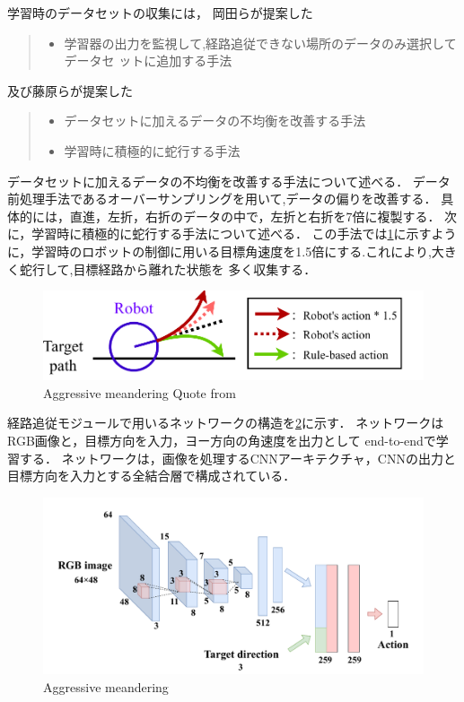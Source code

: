 学習時のデータセットの収集には，
岡田ら\cite{okada2021}が提案した
\begin{quote}
    \begin{itemize}
     \item 学習器の出力を監視して,経路追従できない場所のデータのみ選択してデータセ
     ットに追加する手法
    \end{itemize}
   \end{quote}
及び藤原ら\cite{fujiwara2023}が提案した
\begin{quote}
    \begin{itemize}
     \item データセットに加えるデータの不均衡を改善する手法
     \item 学習時に積極的に蛇行する手法
    \end{itemize}
   \end{quote}

データセットに加えるデータの不均衡を改善する手法について述べる．
データ前処理手法であるオーバーサンプリングを用いて,データの偏りを改善する．
具体的には，直進，左折，右折のデータの中で，左折と右折を7倍に複製する．
次に，学習時に積極的に蛇行する手法について述べる．
この手法では\ref{fig:dakou}に示すように，学習時のロボットの制御に用いる目標角速度を1.5倍にする.これにより,大きく蛇行して,目標経路から離れた状態を
多く収集する．
\begin{figure}[htbp]
    \centering
     \includegraphics[width=130mm]{images/pdf/dakou.pdf}
     \caption{Aggressive meandering Quote from \cite{fujiwara2023}}\label{fig:dakou}
\end{figure}
\newpage
経路追従モジュールで用いるネットワークの構造を\ref{fig:imi_net}に示す．
ネットワークはRGB画像と，目標方向を入力，ヨー方向の角速度を出力として
end-to-endで学習する．
ネットワークは，画像を処理するCNNアーキテクチャ，CNNの出力と目標方向を入力とする全結合層で構成されている．
\begin{figure}[htbp]
    \centering
     \includegraphics[width=130mm]{images/pdf/imi_net.pdf}
     \caption{Aggressive meandering}
     \label{fig:imi_net}
\end{figure}

